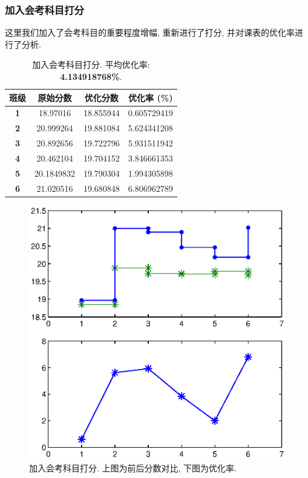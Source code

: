 \documentclass[a4paper]{article}
\begin{document}
  \subsubsection{加入会考科目打分}
   这里我们加入了会考科目的重要程度增幅, 重新进行了打分, 并对课表的优化率进行了分析.
   \begin{table}[H]
   \centering
   \begin{tabular}{|c|c|c|c|}
   \hline
   \bf 班级 & \bf 原始分数 & \bf 优化分数 & \bf 优化率 (\%) \\\hline
   \bf 1 & 18.97016 & 18.855944 & 0.605729419 \\\hline
   \bf 2 & 20.999264 & 19.881084 & 5.624341208 \\\hline
   \bf 3 & 20.892656 & 19.722796 & 5.931511942 \\\hline
   \bf 4 & 20.462104 & 19.704152 & 3.846661353 \\\hline
   \bf 5 & 20.1849832 & 19.790304 & 1.994305898 \\\hline
   \bf 6 & 21.020516 & 19.680848 & 6.806962789 \\\hline
   \end{tabular}
   \caption{加入会考科目打分. 平均优化率: \textbf{4.134918768\%}.}
   \end{table}
   \begin{figure}[H]
   \centerline{\includegraphics[scale=0.8]{mark2.eps}}
   \caption{加入会考科目打分. 上图为前后分数对比, 下图为优化率.}
   \end{figure}
  \clearpage
\end{document}
